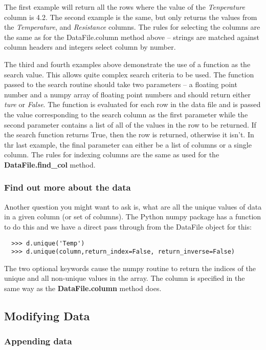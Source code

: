 \documentclass[a4paper,11pt]{scrartcl}
\begin{document}
The first example will return all the rows where the value of the \textit{Tenperature} column is 4.2. The second example is the same, but only returns the values from the \textit{Temperature}, and \textit{Resistance} columns. The rules for selecting the columns are the same as for the DataFile.column method above -- strings are matched against column headers and integers select column by number.

The third and fourth examples above demonstrate the use of a function as the search value. This allows quite complex search criteria to be used. The function passed to the search routine should take two parameters -- a floating point number and a numpy array of floating point numbers and should return either \textit{ture} or \textit{False}. The function is evaluated for each row in the data file and is passed the value corresponding to the search column as the first parameter while the second parameter contains a list of all of the values in the row to be returned. If the search function returns True, then the row is returned, otherwise it isn't. In thr last example, the final parameter can either be a list of columns or a single column. The rules for indexing columns are the same as used for the \textbf{DataFile.find\_col} method.

\subsubsection{Find out more about the data}

Another question you might want to ask is, what are all the unique
values of data in a given column (or set of columns). The Python numpy
package has a function to do this and we have a direct pass through
from the DataFile object for this:

\begin{verbatim}
  >>> d.unique('Temp')
  >>> d.unique(column,return_index=False, return_inverse=False)
\end{verbatim}

The two optional keywords cause the numpy routine to return the
indices of the unique and all non-unique values in the array. The
column is specified in the same way as the \textbf{DataFile.column}
method does.

\subsection{Modifying Data}

\subsubsection{Appending data}
\end{document}
